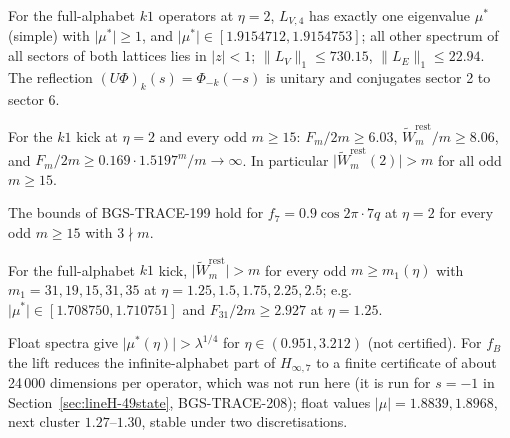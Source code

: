 \begin{theorem}[Certified spectrum at \(\eta=2\), BGS-TRACE-198, proved (computer-assisted)]
For the full-alphabet \(k1\) operators at \(\eta=2\), \(L_{V,4}\) has exactly one eigenvalue \(\mu^*\) (simple) with \(\lvert\mu^*\rvert\ge1\), and \(\lvert\mu^*\rvert\in[1.9154712,1.9154753]\); all other spectrum of all sectors of both lattices lies in \(\lvert z\rvert<1\); \(\lVert L_V\rVert_1\le730.15\), \(\lVert L_E\rVert_1\le22.94\). The reflection \((U\Phi)_k(s)=\Phi_{-k}(-s)\) is unitary and conjugates sector 2 to sector 6.
\end{theorem}

\begin{theorem}
For the \(k1\) kick at \(\eta=2\) and every odd \(m\ge15\): \(F_m/2m\ge6.03\), \(\tilde W^{\mathrm{rest}}_m/m\ge8.06\), and \(F_m/2m\ge0.169\cdot1.5197^m/m\to\infty\). In particular \(\lvert\tilde W^{\mathrm{rest}}_m(2)\rvert>m\) for all odd \(m\ge15\).
\end{theorem}

\begin{corollary}
The bounds of BGS-TRACE-199 hold for \(f_7=0.9\cos2\pi\cdot7q\) at \(\eta=2\) for every odd \(m\ge15\) with \(3\nmid m\).
\end{corollary}

\begin{theorem}
For the full-alphabet \(k1\) kick, \(\lvert\tilde W^{\mathrm{rest}}_m\rvert>m\) for every odd \(m\ge m_1(\eta)\) with \(m_1=31,19,15,31,35\) at \(\eta=1.25,1.5,1.75,2.25,2.5\); e.g.\ \(\lvert\mu^*\rvert\in[1.708750,1.710751]\) and \(F_{31}/2m\ge2.927\) at \(\eta=1.25\).
\end{theorem}

\begin{remark}
Float spectra give \(\lvert\mu^*(\eta)\rvert>\lambda^{1/4}\) for \(\eta\in(0.951,3.212)\) (not certified). For \(f_B\) the lift reduces the infinite-alphabet part of \(H_{\infty,7}\) to a finite certificate of about 24\,000 dimensions per operator, which was not run here (it is run for \(s=-1\) in Section~\ref{sec:lineH-49state}, BGS-TRACE-208); float values \(\lvert\mu\rvert=1.8839,1.8968\), next cluster \(1.27\)--\(1.30\), stable under two discretisations.
\end{remark}

